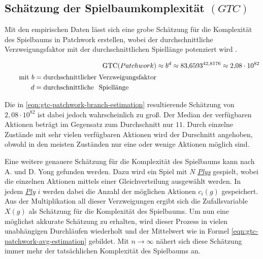 



\subsection*{Schätzung der Spielbaumkomplexität $(GTC)$}

Mit den empirischen Daten lässt sich eine grobe Schätzung für die Komplexität des Spielbaums in Patchwork erstellen, wobei der durchschnittliche Verzweigungsfaktor mit der durchschnittlichen Spiellänge potenziert wird \cite[S. 160]{1194.SearchAndAiInGames}.

\vspace*{-1cm}
\begin{align}
    \label{eqn:gtc-patchwork-branch-estimation}
    \text{GTC}(Patchwork) & \approx b^d \approx {83{,}6593}^{42{,}8176} \approx 2{,}08 \cdot 10^{82} \\[2pt]
    \tag*{$\text{mit }           b = \text{durchschnittlicher Verzweigungsfaktor}$}                  \\
    \tag*{$\phantom{\text{mit }} d = \text{durchschnittliche\phantom{r} \rlap{Spiellänge}\phantom{Verzweigungsfaktor}}$}
\end{align}

Die in \ref{eqn:gtc-patchwork-branch-estimation} resultierende Schätzung von $2{,}08 \cdot 10^{82}$ ist dabei jedoch wahrscheinlich zu groß. Der Median der verfügbaren Aktionen beträgt im Gegensatz zum Durchschnitt nur $11$. Durch einzelne Zustände mit sehr vielen verfügbaren Aktionen wird der Durschnitt angehoben, obwohl in den meisten Zuständen nur eine oder wenige Aktionen möglich sind.

Eine weitere genauere Schätzung für die Komplexität des Spielbaums kann nach A. und D. Yong gefunden werden. Dazu wird ein Spiel mit $N$ \hyperref[text:ply]{\emph{Plys}} gespielt, wobei die einzelnen Aktionen mittels einer Gleichverteilung ausgewählt werden. In jedem \hyperref[text:ply]{\emph{Ply}} $i$ werden dabei die Anzahl der möglichen Aktionen $c_i(g)$ gespeichert. Aus der Multiplikation all dieser Verzweigungen ergibt sich die Zufallsvariable $X(g)$ als Schätzung für die Komplexität des Spielbaums. Um nun eine möglichst akkurate Schätzung zu erhalten, wird dieser Prozess in vielen unabhängigen Durchläufen wiederholt und der Mittelwert wie in Formel \ref{eqn:gtc-patchwork-avg-estimation} gebildet. Mit $n \to \infty$ nähert sich diese Schätzung immer mehr der tatsächlichen Komplexität des Spielbaums an. \cite{2019.GameTreeComplexityEstimation}

